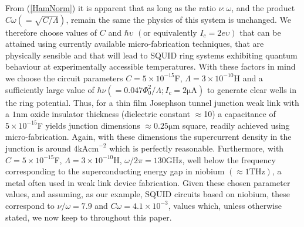 \documentclass[12pt,a4paper,superscriptaddress,showpacs,floatfix,pra]{revtex4-2}
\begin{document}
From (\ref{HamNorm})  it is  apparent that as  long as the  ratio $\nu
:\omega $,  and the product $C\omega  \left( =\sqrt{C/\Lambda }\right)
$,  remain  the same  the  physics of  this  system  is unchanged.  We
therefore choose values of $C$  and $\hbar \upsilon $ $\left( \text{or
equivalently }I_{c}=2e\upsilon  \right) $  that can be  attained using
currently available micro-fabrication  techniques, that are physically
sensible and that  will lead to SQUID ring  systems exhibiting quantum
behaviour  at  experimentally   accessible  temperatures.  With  these
factors  in   mind  we   choose  the  circuit   parameters  $C=5\times
10^{-15}$\textrm{F},  $\Lambda   =3\times  10^{-10}$\textrm{H}  and  a
sufficiently   large   value   of   $\hbar   \nu   \left(   =0.047\Phi
_{0}^{2}/\Lambda ;  I_c = 2\mathrm{\mu  A}\right) $ to  generate clear
wells in  the ring potential. Thus,  for a thin  film Josephson tunnel
junction weak link with  a $1$nm oxide insulator thickness (dielectric
constant  $\approx $10)  a capacitance  of $5\times  10^{-15}$F yields
junction  dimensions  $\approx  0.25\mathrm{\mu  m}$  square,  readily
achieved  using micro-fabrication.  Again, with  these  dimensions the
supercurrent density  in the junction  is around $4\mathrm{kAcm}^{-2}$
which   is   perfectly   reasonable.  Furthermore,   with   $C=5\times
10^{-15}$\textrm{F},  $\Lambda =3\times 10^{-10}  $\textrm{H}, $\omega
/2\pi =130\mathrm{GHz}$, well below the frequency corresponding to the
superconducting    energy    gap    in   niobium    $\left(    \approx
1\mathrm{THz}\right)$,  a  metal  often   used  in  weak  link  device
fabrication. Given these chosen parameter values, and assuming, as our
example,  SQUID circuits based  on niobium,  these correspond  to $\nu
/\omega =7.9$  and $C\omega =4.1\times 10^{-3}$,  values which, unless
otherwise stated, we now keep to throughout this paper.
\end{document}
